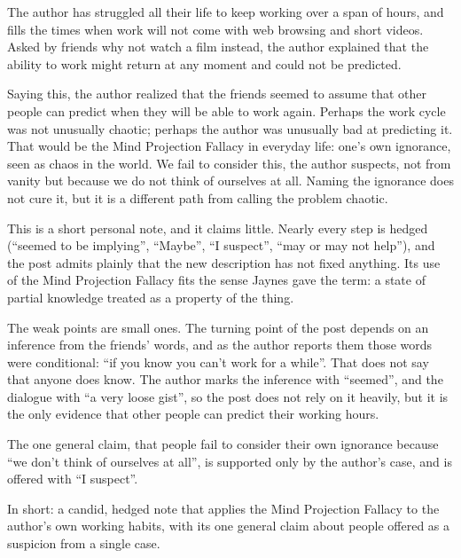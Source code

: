 \begin{afterword}
\summaryhead

The author has struggled all their life to keep working over a span of hours, and fills the times when work will not come with web browsing and short videos. Asked by friends why not watch a film instead, the author explained that the ability to work might return at any moment and could not be predicted.

Saying this, the author realized that the friends seemed to assume that other people can predict when they will be able to work again. Perhaps the work cycle was not unusually chaotic; perhaps the author was unusually bad at predicting it. That would be the Mind Projection Fallacy in everyday life: one's own ignorance, seen as chaos in the world. We fail to consider this, the author suspects, not from vanity but because we do not think of ourselves at all. Naming the ignorance does not cure it, but it is a different path from calling the problem chaotic.

\responsehead

This is a short personal note, and it claims little. Nearly every step is hedged (``seemed to be implying'', ``Maybe'', ``I suspect'', ``may or may not help''), and the post admits plainly that the new description has not fixed anything. Its use of the Mind Projection Fallacy fits the sense Jaynes gave the term: a state of partial knowledge treated as a property of the thing.

The weak points are small ones. The turning point of the post depends on an inference from the friends' words, and as the author reports them those words were conditional: ``if you know you can't work for a while''. That does not say that anyone does know. The author marks the inference with ``seemed'', and the dialogue with ``a very loose gist'', so the post does not rely on it heavily, but it is the only evidence that other people can predict their working hours.

The one general claim, that people fail to consider their own ignorance because ``we don't think of ourselves at all'', is supported only by the author's case, and is offered with ``I suspect''.

In short: a candid, hedged note that applies the Mind Projection Fallacy to the author's own working habits, with its one general claim about people offered as a suspicion from a single case.
\end{afterword}
